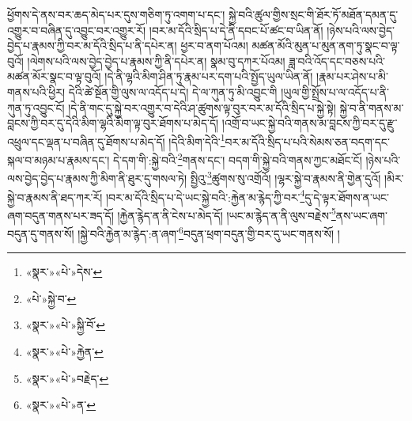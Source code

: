 ཕྱོགས་དེ་ནས་བར་ཆད་མེད་པར་དུས་གཅིག་ཏུ་འགག་པ་དང་། སྐྱེ་བའི་ཚུལ་གྱིས་སྲང་གི་ཐོར་ཏོ་མཐོན་དམན་དུ་འགྱུར་བ་བཞིན་དུ་འབྱུང་བར་འགྱུར་རོ། །བར་མ་དོའི་སྲིད་པ་དེ་ནི་དབང་པོ་ཚང་བ་ཡིན་ནོ། །ཉེས་པའི་ལས་བྱེད་བྱེད་པ་རྣམས་ཀྱི་བར་མ་དོའི་སྲིད་པ་ནི་དཔེར་ན། ཕྱར་བ་ནག་པོའམ། མཚན་མོའི་མུན་པ་མུན་ནག་ཏུ་སྣང་བ་ལྟ་བུའོ། །ལེགས་པའི་ལས་བྱེད་བྱེད་པ་རྣམས་ཀྱི་ནི་དཔེར་ན། སྣམ་བུ་དཀར་པོའམ། ཟླ་བའི་འོད་དང་བཅས་པའི་མཚན་མོར་སྣང་བ་ལྟ་བུའོ། །དེ་ནི་ལྷའི་མིག་ཤིན་ཏུ་རྣམ་པར་དག་པའི་སྤྱོད་ཡུལ་ཡིན་ནོ། །རྣམ་པར་ཤེས་པ་མི་གནས་པའི་ཕྱིར། དེའི་ཚེ་སྔོན་གྱི་ལུས་ལ་འདོད་པ་དེ། དེ་ལ་ཀུན་ཏུ་མི་འབྱུང་གི །ཡུལ་གྱི་སྤྲོས་པ་ལ་འདོད་པ་ནི་ཀུན་ཏུ་འབྱུང་ངོ། །དེ་ནི་གང་དུ་སྐྱེ་བར་འགྱུར་བ་དེའི་ཤ་ཚུགས་ལྟ་བུར་བར་མ་དོའི་སྲིད་པ་སྐྱེ་སྟེ། སྐྱེ་བ་ནི་གནས་མ་བླངས་ཀྱི་བར་དུ་དེའི་མིག་ལྷའི་མིག་ལྟ་བུར་ཐོགས་པ་མེད་དོ། །འགྲོ་བ་ཡང་སྐྱེ་བའི་གནས་མ་བླངས་ཀྱི་བར་དུ་རྫུ་འཕྲུལ་དང་ལྡན་པ་བཞིན་དུ་ཐོགས་པ་མེད་དོ། །དེའི་མིག་དེའི་\footnote{«སྣར་»«པེ་»དེས་}བར་མ་དོའི་སྲིད་པ་པའི་སེམས་ཅན་བདག་དང་སྐལ་བ་མཉམ་པ་རྣམས་དང་། དེ་དག་གི་:སྐྱེ་བའི་\footnote{«པེ་»སྐྱེ་བ་}གནས་དང་། བདག་གི་སྐྱེ་བའི་གནས་ཀྱང་མཐོང་ངོ། །ཉེས་པའི་ལས་བྱེད་བྱེད་པ་རྣམས་ཀྱི་མིག་ནི་ཐུར་དུ་གསལ་ཏེ། སྤྱིའུ་\footnote{«སྣར་»«པེ་»སྐྱི་བོ་}ཚུགས་སུ་འགྲོའོ། །ལྷར་སྐྱེ་བ་རྣམས་ནི་གྱེན་དུའོ། །མིར་སྐྱེ་བ་རྣམས་ནི་ཐད་ཀར་རོ། །བར་མ་དོའི་སྲིད་པ་དེ་ཡང་སྐྱེ་བའི་:རྐྱེན་མ་རྙེད་ཀྱི་བར་\footnote{«སྣར་»«པེ་»རྐྱེན་}དུ་དེ་ལྟར་ཐོགས་ན་ཡང་ཞག་བདུན་གནས་པར་ཟད་དོ། །རྐྱེན་རྙེད་ན་ནི་ངེས་པ་མེད་དོ། །ཡང་མ་རྙེད་ན་ནི་ལུས་བརྗེས་\footnote{«སྣར་»«པེ་»བརྗེད་}ནས་ཡང་ཞག་བདུན་དུ་གནས་སོ། །སྐྱེ་བའི་རྐྱེན་མ་རྙེད་:ན་ཞག་\footnote{«སྣར་»«པེ་»ན་}བདུན་ཕྲག་བདུན་གྱི་བར་དུ་ཡང་གནས་སོ། །
